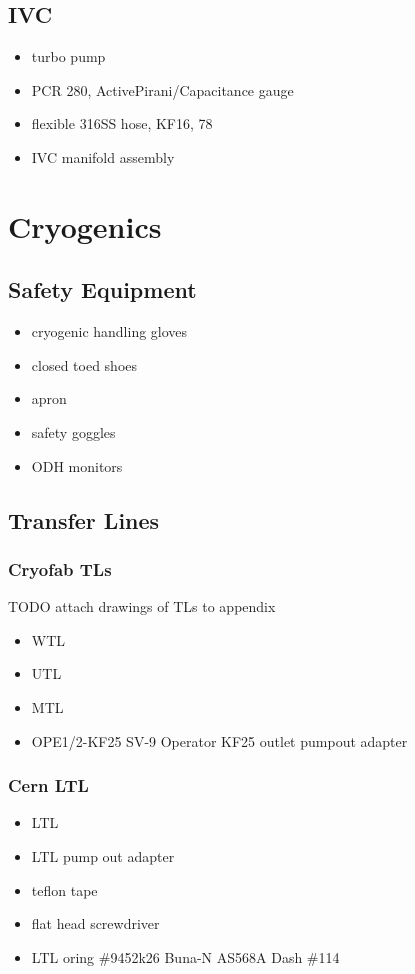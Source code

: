   \subsection{IVC}
\begin{itemize}
 \item turbo pump
\item {} PCR 280, ActivePirani/Capacitance gauge
\item {} flexible 316SS hose, KF16, 78\inches
\item IVC manifold assembly
\end{itemize}


\section{Cryogenics}
  \subsection{Safety Equipment}
\begin{itemize}
 \item cryogenic handling gloves
\item closed toed shoes
\item apron
\item safety goggles
\item ODH monitors
\end{itemize}

  \subsection{Transfer Lines}
\subsubsection{Cryofab TLs}
TODO attach drawings of TLs to appendix
\begin{itemize}
\item WTL
\item UTL
\item MTL
\item {} OPE1/2-KF25 SV-9 Operator KF25 outlet pumpout adapter
\end{itemize}

\subsubsection{Cern LTL}
\begin{itemize}
\item LTL
\item LTL pump out adapter
\item teflon tape
\item flat head screwdriver
\item LTL oring  \#9452k26 Buna-N AS568A Dash \#114
\end{itemize}


